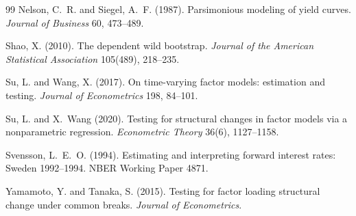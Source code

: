 \documentclass[11pt]{article}
\begin{document}
\begin{thebibliography}{99}
Nelson, C.~R. and Siegel, A.~F. (1987). Parsimonious modeling of yield curves. \emph{Journal of Business} 60, 473--489.

Shao, X. (2010). The dependent wild bootstrap. \emph{Journal of the American Statistical Association} 105(489), 218--235.

Su, L. and Wang, X. (2017). On time-varying factor models: estimation and testing. \emph{Journal of Econometrics} 198, 84--101.

Su, L. and X.~Wang (2020). Testing for structural changes in factor models via a nonparametric regression. \emph{Econometric Theory} 36(6), 1127--1158.

Svensson, L.~E.~O. (1994). Estimating and interpreting forward interest rates: Sweden 1992--1994. NBER Working Paper 4871.

Yamamoto, Y. and Tanaka, S. (2015). Testing for factor loading structural change under common breaks. \emph{Journal of Econometrics}.

\end{thebibliography}
\end{document}
